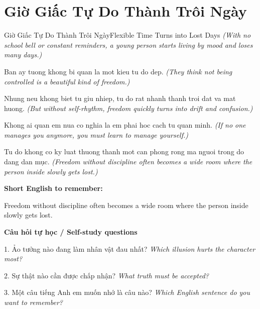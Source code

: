 \section{Giờ Giấc Tự Do Thành Trôi Ngày}
\begin{truyen}{Giờ Giấc Tự Do Thành Trôi Ngày}{Flexible Time Turns into Lost Days}
\textit{(With no school bell or constant reminders, a young person starts living by mood and loses many days.)}

Ban ay tuong khong bi quan la mot kieu tu do dep.
\textit{(They think not being controlled is a beautiful kind of freedom.)}

Nhung neu khong biet tu giu nhiep, tu do rat nhanh thanh troi dat va mat huong.
\textit{(But without self-rhythm, freedom quickly turns into drift and confusion.)}

Khong ai quan em nua co nghia la em phai hoc cach tu quan minh.
\textit{(If no one manages you anymore, you must learn to manage yourself.)}

\end{truyen}

\begin{baihoc}
Tu do khong co ky luat thuong thanh mot can phong rong ma nguoi trong do dang dan mục.
\textit{(Freedom without discipline often becomes a wide room where the person inside slowly gets lost.)}
\end{baihoc}

\begin{ghinhoanh}
\textbf{Short English to remember:}

Freedom without discipline often becomes a wide room where the person inside slowly gets lost.

\end{ghinhoanh}

\begin{tuhocnhanh}
\textbf{Câu hỏi tự học / Self-study questions}

1. Ảo tưởng nào đang làm nhân vật đau nhất? \textit{Which illusion hurts the character most?}

2. Sự thật nào cần được chấp nhận? \textit{What truth must be accepted?}

3. Một câu tiếng Anh em muốn nhớ là câu nào? \textit{Which English sentence do you want to remember?}
\end{tuhocnhanh}
\ngancach

